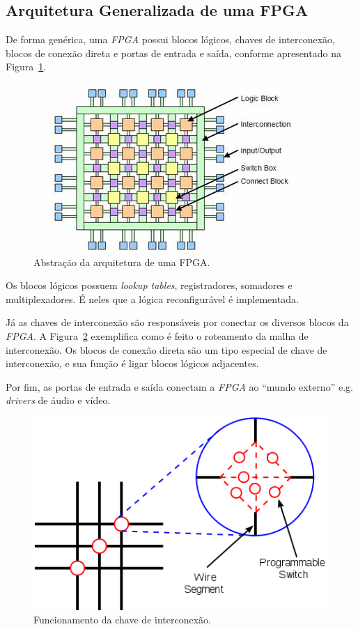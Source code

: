     \subsection{Arquitetura Generalizada de uma FPGA}
    {
        De forma genérica, uma \textit{FPGA} possui blocos lógicos, chaves de
        interconexão, blocos de conexão direta e portas de entrada e saída,
        conforme apresentado na Figura~\ref{fig:fpga_general_arch}.
    }

    \begin{figure}[H]
    \centering
    \includegraphics[width=.7\linewidth]
        {../images/fpga_architecture_abstraction_-_olin_college.jpg}
        \caption[Abstração da arquitetura de uma FPGA]
            {Abstração da arquitetura de uma FPGA.}
        \label{fig:fpga_general_arch}
    \end{figure}

    {
        Os blocos lógicos possuem \textit{lookup tables}, registradores, somadores
        e multiplexadores. É neles que a lógica reconfigurável é implementada.
    }

    {
        Já as chaves de interconexão são responsáveis por conectar os diversos
        blocos da \textit{FPGA}. A Figura~\ref{fig:fpga_switch_box} exemplifica
        como é feito o roteamento da malha de interconexão. Os blocos de conexão
        direta são um tipo especial de chave de interconexão, e sua função é ligar
        blocos lógicos adjacentes.
    }

    {
        Por fim, as portas de entrada e saída conectam a \textit{FPGA} ao ``mundo
        externo'' e.g. \textit{drivers} de áudio e vídeo.
    }

    \begin{figure}[H]
    \centering
    \includegraphics[width=.5\linewidth]
        {../images/switch_box_wikimedia.png}
        \caption[Funcionamento da chave de interconexão]
            {Funcionamento da chave de interconexão.}
        \label{fig:fpga_switch_box}
    \end{figure}


